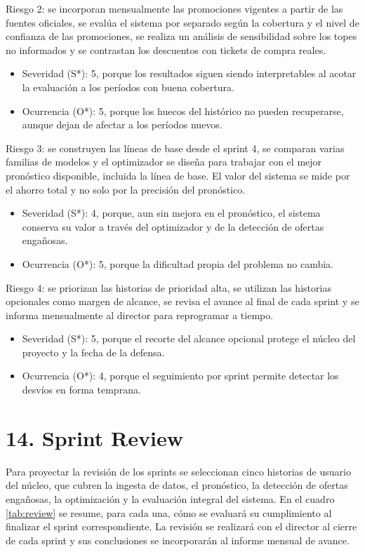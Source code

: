 \documentclass[
11pt, %
]{charter}
\begin{document}
Riesgo 2: se incorporan mensualmente las promociones vigentes a partir de las fuentes oficiales, se evalúa el sistema por separado según la cobertura y el nivel de confianza de las promociones, se realiza un análisis de sensibilidad sobre los topes no informados y se contrastan los descuentos con tickets de compra reales.
\begin{itemize}
	\item Severidad (S*): 5, porque los resultados siguen siendo interpretables al acotar la evaluación a los períodos con buena cobertura.
	\item Ocurrencia (O*): 5, porque los huecos del histórico no pueden recuperarse, aunque dejan de afectar a los períodos nuevos.
\end{itemize}

Riesgo 3: se construyen las líneas de base desde el sprint 4, se comparan varias familias de modelos y el optimizador se diseña para trabajar con el mejor pronóstico disponible, incluida la línea de base. El valor del sistema se mide por el ahorro total y no solo por la precisión del pronóstico.
\begin{itemize}
	\item Severidad (S*): 4, porque, aun sin mejora en el pronóstico, el sistema conserva su valor a través del optimizador y de la detección de ofertas engañosas.
	\item Ocurrencia (O*): 5, porque la dificultad propia del problema no cambia.
\end{itemize}

Riesgo 4: se priorizan las historias de prioridad alta, se utilizan las historias opcionales como margen de alcance, se revisa el avance al final de cada sprint y se informa mensualmente al director para reprogramar a tiempo.
\begin{itemize}
	\item Severidad (S*): 5, porque el recorte del alcance opcional protege el núcleo del proyecto y la fecha de la defensa.
	\item Ocurrencia (O*): 4, porque el seguimiento por sprint permite detectar los desvíos en forma temprana.
\end{itemize}

\section{14. Sprint Review}
\label{sec:sprint_review}

Para proyectar la revisión de los sprints se seleccionan cinco historias de usuario del núcleo, que cubren la ingesta de datos, el pronóstico, la detección de ofertas engañosas, la optimización y la evaluación integral del sistema. En el cuadro \ref{tab:review} se resume, para cada una, cómo se evaluará su cumplimiento al finalizar el sprint correspondiente. La revisión se realizará con el director al cierre de cada sprint y sus conclusiones se incorporarán al informe mensual de avance.
\end{document}
